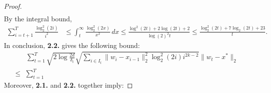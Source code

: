 \begin{proof}
\begin{align*}
\end{align*}
By the integral bound,
\begin{align*}
    \sum_{i=t+1}^T \frac{\log_2^2(2i)}{i^2}
    &\leq \int_t^\infty \frac{\log_2^2(2x)}{x^2} \, dx
    \leq \frac{\log^2(2t) + 2\log(2t) + 2}{\log(2)^2 t}
    \leq \frac{\log_2^2(2t)+7\log_2(2t)+23}{t}.
\end{align*}
In conclusion, \textbf{2.2.} gives the following bound:
\begin{align*}
    &\sum_{t=1}^T \sqrt{2\log\frac{2d}{\delta_t}} \sqrt{\sum_{i\in I_t}\|w_i-x_{i-1}\|_2^2\log_2^2(2i)i^{2k-2}}\|w_t-x^*\|_2 \\
    \leq & \sum_{t=1}^T 
\end{align*}
Moreover, \textbf{2.1.} and \textbf{2.2.} together imply:

\end{proof}
